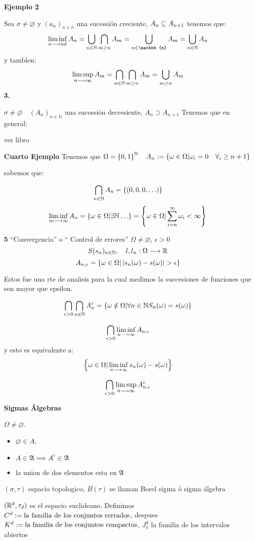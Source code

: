 \textbf{Ejemplo 2}

Sea $ \sigma \neq \varnothing $ y $ (a_n)_{n \in \mathbb{n}} $ una sucessión creciente, $A_n \subseteq A_{n+1} $
tenemos que:
\[ \liminf_{n \goesto \inf } A_n = \bigcup_{n \in \mathbb{N}} \bigcap_{m \geq n} A_m = \bigcup_{n \in \mathbb{n}} A_m = \bigcup_{n \in \mathbb{N}} A_n \]
y tambíen:
\[ \limsup_{n \longrightarrow \infty} A_m = \bigcap_{n \in \mathbb{N}} \bigcap_{m \geq n} A_{m} = \bigcup_{m \geq n} A_m \]
\textbf{3.}

$ \sigma \neq \varnothing \quad (A_n)_{n \in \mathbb{N}} $ una sucessión decresiente, $A_n \supset A_{n+1} $
Tenemos que en general:

ver libro

\textbf{Cuarto Ejemplo}
Tenemos que $ \Omega = \left\lbrace 0,1 \right\rbrace^{\mathbb{N}} \quad A_n := \left\lbrace \omega \in \Omega | \omega_i = 0 \quad \forall_i \geq n+1  \right\rbrace$


sabemos que:

\[ \bigcap_{n \in \mathbb{N}} A_n = \left\lbrace (0,0,0, \ldots ) \right\rbrace \]
\[ \liminf_{m \longrightarrow \infty } A_n = \left\lbrace \omega \in \Omega | \exists \mathbb{N} \ldots \right\rbrace = \left\lbrace \omega \in \Omega | \sum_{i = n}^{\infty} \omega_i < \infty \right\rbrace \]

\textbf{5} ``Convergencia'' o `` Control de errores'' 
$\Omega \neq \varnothing$, $\epsilon > 0 $
\[ S(s_n)_{n \in \mathbb{N}}, \quad l,l_n: \Omega \longrightarrow \mathbb{R} \]
\[ A_{n,\epsilon} = \left\lbrace \omega \in \Omega | \left| s_n(\omega) - s(\omega) \right| > \epsilon  \right\rbrace \]

Estos fue una rte de analisis para la cual medimos la succesiones de funciones que son mayor que epsilon.

\[ \bigcap_{\epsilon > 0} \bigcap_{n \in \mathbb{N}} A_n^c = \left\lbrace \omega \notin \Omega | \forall n \in \mathbb{N} S_n(\omega) = s(\omega) \right\rbrace \]

\[ \bigcap_{\epsilon > 0 } \liminf_{n \longrightarrow \infty} A_{n,\epsilon} \]
y esto es equivalente a:
\[ \left\lbrace \omega \in \Omega | \liminf_{n \longrightarrow \infty} s_n(\omega) - s(\omega) \right\rbrace \]

\[ \bigcap_{\epsilon > 0} \limsup_{n \longrightarrow \infty} A_{n,\epsilon}^c \]


\textbf{Sigmas Álgebras} 

$\Omega \neq \varnothing$.
\begin{itemize}
	\item $\varnothing \in A$,
	\item $A \in \mathfrak{A} \implies A^c  \in \mathfrak{A} $
	\item la union de dos elementos esta en $ \mathfrak{A} $ 
\end{itemize}


\begin{define}
	$(\sigma, \tau)$ espacio topologico, $B(\tau)$ se llaman Borel sigma ó sigma álgebra 
\end{define}

\begin{lema}
	$(\mathbb{R}^d,\tau_d)$ es el espacio euclideano. Definimos $C^d := \textrm{la familia de los conjuntos cerrados}$, despues $K^d := \textrm{la familia de los conjuntos compactos}$, $J_a^d $ la familia de los intervalos abiertos
\end{lema}